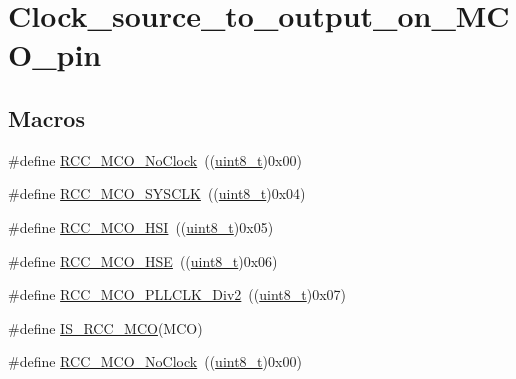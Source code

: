 \hypertarget{group___clock__source__to__output__on___m_c_o__pin}{}\section{Clock\+\_\+source\+\_\+to\+\_\+output\+\_\+on\+\_\+\+M\+C\+O\+\_\+pin}
\label{group___clock__source__to__output__on___m_c_o__pin}
\subsection*{Macros}
\begin{DoxyCompactItemize}
\item 
\#define \hyperlink{group___clock__source__to__output__on___m_c_o__pin_ga1f39ff9f5606d3ad56e221d253be17d3}{R\+C\+C\+\_\+\+M\+C\+O\+\_\+\+No\+Clock}~((\hyperlink{_p_e___types_8h_aba7bc1797add20fe3efdf37ced1182c5}{uint8\+\_\+t})0x00)
\item 
\#define \hyperlink{group___clock__source__to__output__on___m_c_o__pin_gab766ad89492ffe915de3438aaa96891b}{R\+C\+C\+\_\+\+M\+C\+O\+\_\+\+S\+Y\+S\+C\+LK}~((\hyperlink{_p_e___types_8h_aba7bc1797add20fe3efdf37ced1182c5}{uint8\+\_\+t})0x04)
\item 
\#define \hyperlink{group___clock__source__to__output__on___m_c_o__pin_ga7206cdf03826781dc4fb1b094475d744}{R\+C\+C\+\_\+\+M\+C\+O\+\_\+\+H\+SI}~((\hyperlink{_p_e___types_8h_aba7bc1797add20fe3efdf37ced1182c5}{uint8\+\_\+t})0x05)
\item 
\#define \hyperlink{group___clock__source__to__output__on___m_c_o__pin_ga8bd64bbefd2a725a0cfe2f2902dd9b0f}{R\+C\+C\+\_\+\+M\+C\+O\+\_\+\+H\+SE}~((\hyperlink{_p_e___types_8h_aba7bc1797add20fe3efdf37ced1182c5}{uint8\+\_\+t})0x06)
\item 
\#define \hyperlink{group___clock__source__to__output__on___m_c_o__pin_ga1ce4233675bd7bdcb0220ed10ee7d8be}{R\+C\+C\+\_\+\+M\+C\+O\+\_\+\+P\+L\+L\+C\+L\+K\+\_\+\+Div2}~((\hyperlink{_p_e___types_8h_aba7bc1797add20fe3efdf37ced1182c5}{uint8\+\_\+t})0x07)
\item 
\#define \hyperlink{group___clock__source__to__output__on___m_c_o__pin_ga0c2d4d6aa8881e01b8c06d8816284b73}{I\+S\+\_\+\+R\+C\+C\+\_\+\+M\+CO}(M\+CO)
\item 
\#define \hyperlink{group___clock__source__to__output__on___m_c_o__pin_ga1f39ff9f5606d3ad56e221d253be17d3}{R\+C\+C\+\_\+\+M\+C\+O\+\_\+\+No\+Clock}~((\hyperlink{_p_e___types_8h_aba7bc1797add20fe3efdf37ced1182c5}{uint8\+\_\+t})0x00)

\end{DoxyCompactItemize}
